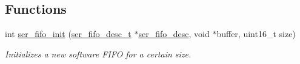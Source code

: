 \subsection*{Functions}
\begin{DoxyCompactItemize}
\item 
int \mbox{\hyperlink{group__fifo__group_ga047008758cc687991adab14866208100}{ser\+\_\+fifo\+\_\+init}} (\mbox{\hyperlink{group__fifo__group_gab18c001ea5c010cc8dfdedb3525f5013}{ser\+\_\+fifo\+\_\+desc\+\_\+t}} $\ast$\mbox{\hyperlink{structser__fifo__desc}{ser\+\_\+fifo\+\_\+desc}}, void $\ast$buffer, uint16\+\_\+t size)
\begin{DoxyCompactList}\small\item\em Initializes a new software F\+I\+FO for a certain \textquotesingle{}size\textquotesingle{}. \end{DoxyCompactList}\end{DoxyCompactItemize}
